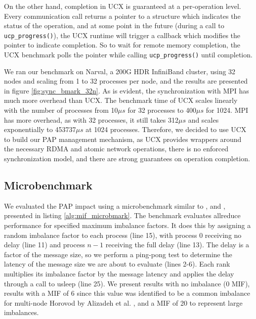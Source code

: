On the other hand, completion in UCX is guaranteed at a per-operation level. 
Every communication call returns a pointer to a structure which indicates the status of the operation, and at some point in the future (during a call to \texttt{ucp\_progress()}), the UCX runtime will trigger a callback which modifies the pointer to indicate completion.
So to wait for remote memory completion, the UCX benchmark polls the pointer while calling \texttt{ucp\_progress()} until completion.

We ran our benchmark on Narval, a 200G HDR InfiniBand cluster, using 32 nodes and scaling from 1 to 32 processes per node, and the results are presented in figure \ref{fig:sync_bmark_32n}.
As is evident, the synchronization with MPI has much more overhead than UCX.
The benchmark time of UCX scales linearly with the number of processes from 10$\mu s$ for 32 processes to 400$\mu s$ for 1024.
MPI has more overhead, as with 32 processes, it still takes 312$\mu s$ and scales exponentially to 453737$\mu s$ at 1024 processes.
Therefore, we decided to use UCX to build our PAP management mechanism, as UCX provides wrappers around the necessary RDMA and atomic network operations, there is no enforced synchronization model, and there are strong guarantees on operation completion. 




\subsection{Microbenchmark}
We evaluated the PAP impact using a microbenchmark similar to \cite{Faraj2008StudyProcArrivalMPIColl}, and \cite{Li2020DLPartialColl}, presented in listing \ref{alg:mif_microbmark}.
The benchmark evaluates allreduce performance for specified maximum imbalance factors. 
It does this by assigning a random imbalance factor to each process (line 15), with process 0 receiving no delay (line 11) and process $n-1$ receiving the full delay (line 13).
The delay is a factor of the message size, so we perform a ping-pong test to determine the latency of the message size we are about to evaluate (lines 2-6).
Each rank multiplies its imbalance factor by the message latency and applies the delay through a call to usleep (line 25).
We present results with no imbalance (0 MIF), results with a MIF of 6 since this value was identified to be a common imbalance for multi-node Horovod by Alizadeh et al. \cite{Alizadeh2022PAPCollDL}, and a MIF of 20 to represent large imbalances.

